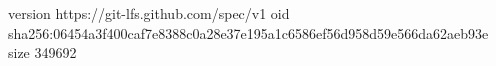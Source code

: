 version https://git-lfs.github.com/spec/v1
oid sha256:06454a3f400caf7e8388c0a28e37e195a1c6586ef56d958d59e566da62aeb93e
size 349692
